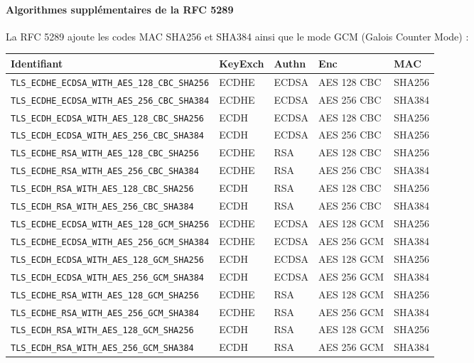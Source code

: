 \documentclass[a4paper,11pt,french]{article}
\begin{document}
\paragraph{Algorithmes supplémentaires de la RFC 5289} 
La RFC 5289 ajoute les codes MAC SHA256 et SHA384 ainsi que le mode GCM (Galois Counter Mode) :
\begin{center}
\begin{tabularx}{17cm}{|l|l|l|X|l|}
\hline
\textbf{Identifiant} & \textbf{KeyExch} & \textbf{Authn}& \textbf{Enc}& \textbf{MAC}\\
\hline
\verb+TLS_ECDHE_ECDSA_WITH_AES_128_CBC_SHA256+&ECDHE&ECDSA&AES 128 CBC&SHA256\\
\hline
\verb+TLS_ECDHE_ECDSA_WITH_AES_256_CBC_SHA384+&ECDHE&ECDSA&AES 256 CBC&SHA384\\
\hline
\verb+TLS_ECDH_ECDSA_WITH_AES_128_CBC_SHA256+&ECDH&ECDSA&AES 128 CBC&SHA256\\
\hline
\verb+TLS_ECDH_ECDSA_WITH_AES_256_CBC_SHA384+&ECDH&ECDSA&AES 256 CBC&SHA256\\
\hline
\verb+TLS_ECDHE_RSA_WITH_AES_128_CBC_SHA256+&ECDHE&RSA&AES 128 CBC&SHA256\\
\hline
\verb+TLS_ECDHE_RSA_WITH_AES_256_CBC_SHA384+&ECDHE&RSA&AES 256 CBC&SHA384\\
\hline
\verb+TLS_ECDH_RSA_WITH_AES_128_CBC_SHA256+&ECDH&RSA&AES 128 CBC&SHA256\\
\hline
\verb+TLS_ECDH_RSA_WITH_AES_256_CBC_SHA384+&ECDH&RSA&AES 256 CBC&SHA384\\
\hline
\verb+TLS_ECDHE_ECDSA_WITH_AES_128_GCM_SHA256+&ECDHE&ECDSA&AES 128 GCM&SHA256\\
\hline
\verb+TLS_ECDHE_ECDSA_WITH_AES_256_GCM_SHA384+&ECDHE&ECDSA&AES 256 GCM&SHA384\\
\hline
\verb+TLS_ECDH_ECDSA_WITH_AES_128_GCM_SHA256+&ECDH&ECDSA&AES 128 GCM&SHA256\\
\hline
\verb+TLS_ECDH_ECDSA_WITH_AES_256_GCM_SHA384+&ECDH&ECDSA&AES 256 GCM&SHA384\\
\hline
\verb+TLS_ECDHE_RSA_WITH_AES_128_GCM_SHA256+&ECDHE&RSA&AES 128 GCM&SHA256\\
\hline
\verb+TLS_ECDHE_RSA_WITH_AES_256_GCM_SHA384+&ECDHE&RSA&AES 256 GCM&SHA384\\
\hline
\verb+TLS_ECDH_RSA_WITH_AES_128_GCM_SHA256+&ECDH&RSA&AES 128 GCM&SHA256\\
\hline
\verb+TLS_ECDH_RSA_WITH_AES_256_GCM_SHA384+&ECDH&RSA&AES 256 GCM&SHA384\\
\hline
\end{tabularx}
\end{center}
\end{document}
